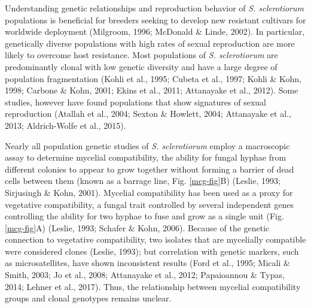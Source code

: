 Understanding genetic relationships and reproduction behavior of
\emph{S. sclerotiorum} populations is beneficial for breeders seeking to
develop new resistant cultivars for worldwide deployment (Milgroom,
1996; McDonald \& Linde, 2002). In particular, genetically diverse
populations with high rates of sexual reproduction are more likely to
overcome host resistance. Most populations of \emph{S. sclerotiorum} are
predominantly clonal with low genetic diversity and have a large degree
of population fragmentation (Kohli et al., 1995; Cubeta et al., 1997;
Kohli \& Kohn, 1998; Carbone \& Kohn, 2001; Ekins et al., 2011;
Attanayake et al., 2012). Some studies, however have found populations
that show signatures of sexual reproduction (Atallah et al., 2004;
Sexton \& Howlett, 2004; Attanayake et al., 2013; Aldrich-Wolfe et al.,
2015).

Nearly all population genetic studies of \emph{S. sclerotiorum} employ a
macroscopic assay to determine mycelial compatibility, the ability for
fungal hyphae from different colonies to appear to grow together without
forming a barrier of dead cells between them (known as a barrage line,
Fig. \ref{mcg-fig}B) (Leslie, 1993; Sirjusingh \& Kohn, 2001). Mycelial
compatibility has been used as a proxy for vegetative compatibility, a
fungal trait controlled by several independent genes controlling the
ability for two hyphae to fuse and grow as a single unit (Fig.
\ref{mcg-fig}A) (Leslie, 1993; Schafer \& Kohn, 2006). Because of the
genetic connection to vegetative compatibility, two isolates that are
mycelially compatible were considered clones (Leslie, 1993); but
correlation with genetic markers, such as microsatellites, have shown
inconsistent results (Ford et al., 1995; Micali \& Smith, 2003; Jo et
al., 2008; Attanayake et al., 2012; Papaioannou \& Typas, 2014; Lehner
et al., 2017). Thus, the relationship between mycelial compatibility
groups and clonal genotypes remains unclear.

